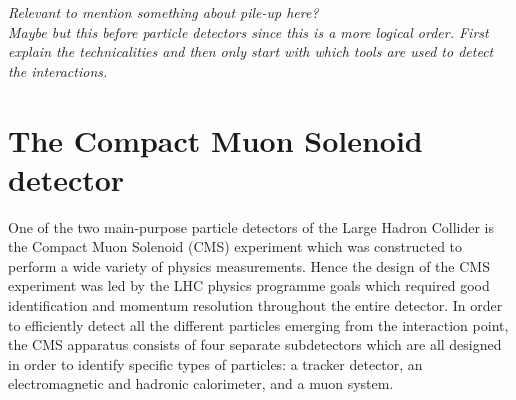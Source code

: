 \textit{Relevant to mention something about pile-up here?}
\\
\textit{Maybe but this before particle detectors since this is a more logical order. First explain the technicalities and then only start with which tools are used to detect the interactions.}

\section{The Compact Muon Solenoid detector}\label{sec::CMS}

One of the two main-purpose particle detectors of the Large Hadron Collider is the Compact Muon Solenoid (CMS) experiment which was constructed to perform a wide variety of physics measurements. Hence the design of the CMS experiment was led by the LHC physics programme goals which required good identification and momentum resolution throughout the entire detector.
In order to efficiently detect all the different particles emerging from the interaction point, the CMS apparatus consists of four separate subdetectors which are all designed in order to identify specific types of particles: a tracker detector, an electromagnetic and hadronic calorimeter, and a muon system.


